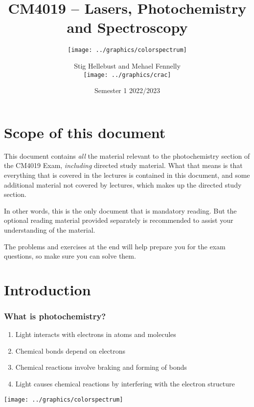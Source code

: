 \documentclass[a4paper,12pt,titlepage]{article}
\title{CM4019 -- Lasers, Photochemistry and Spectroscopy}
\subtitle{\texttt{[image: ../graphics/colorspectrum]}}
\author{Stig Hellebust and Mehael Fennelly\\\texttt{[image: ../graphics/crac]}}
\institute{School of Chemistry \\ University College Cork}
\date{Semester 1 2022/2023}
\begin{document}

\begin{frame}
	\titlepage
\end{frame}

\newpage

\section*{Scope of this document}
This document contains \emph{all} the material relevant to the photochemistry section of the CM4019 Exam, \emph{including} directed study material. What that means is that everything that is covered in the lectures is contained in this document, and some additional material not covered by lectures, which makes up the directed study section. 

In other words, this is the only document that is mandatory reading. But the optional reading material provided separately is recommended to assist your understanding of the material.

The problems and exercises at the end will help prepare you for the exam questions, so make sure you can solve them.

\section{Introduction}


\begin{frame}[<+->]
\frametitle{What is photochemistry?}
\begin{enumerate}
\item Light interacts with electrons in atoms and molecules
\item Chemical bonds depend on electrons
\item Chemical reactions involve braking and forming of bonds
\item Light causes chemical reactions by interfering with the electron structure
\end{enumerate}
\end{frame}

\begin{frame}
  \begin{center}
     \texttt{[image: ../graphics/colorspectrum]}
  \end{center}
\end{frame}
\end{document}
